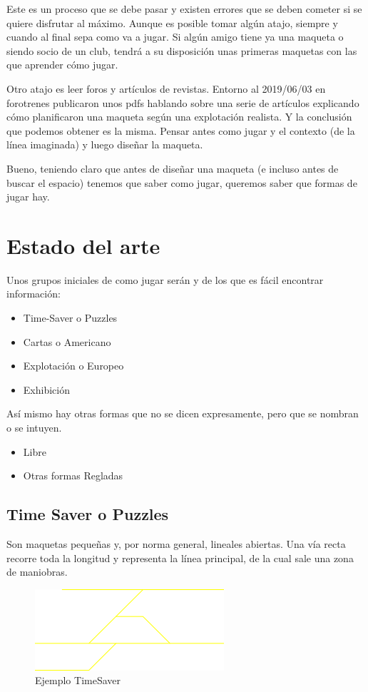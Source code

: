 Este es un proceso que se debe pasar y existen errores que se deben cometer si se quiere disfrutar al máximo. Aunque es posible tomar algún atajo, siempre y cuando al final sepa como va a jugar. Si algún amigo tiene ya una maqueta o siendo socio de un club, tendrá a su disposición unas primeras maquetas con las que aprender cómo jugar.

Otro atajo es leer foros y artículos de revistas. Entorno al 2019/06/03 en forotrenes publicaron unos pdfs hablando sobre una serie de artículos explicando cómo planificaron una maqueta según una explotación realista. Y la conclusión que podemos obtener es la misma. Pensar antes como jugar y el contexto (de la línea imaginada) y luego diseñar la maqueta.

Bueno, teniendo claro que antes de diseñar una maqueta (e incluso antes de buscar el espacio) tenemos que saber como jugar, queremos saber que formas de jugar hay.

\section{Estado del arte}
Unos grupos iniciales de como jugar serán y de los que es fácil encontrar información:

\begin{itemize}
	\item Time-Saver o Puzzles
	\item Cartas o Americano
	\item Explotación o Europeo
	\item Exhibición
\end{itemize}
Así mismo hay otras formas que no se dicen expresamente, pero que se nombran o se intuyen.
\begin{itemize}
	\item Libre
	\item Otras formas Regladas
\end{itemize}
\subsection{Time Saver o Puzzles}
Son maquetas pequeñas y, por norma general, lineales abiertas. Una vía recta recorre toda la longitud y representa la línea principal, de la cual sale una zona de maniobras.
\begin{figure}[h]
	\centering\includegraphics[]{chapters/01_jugar/path4865.png}
	\caption{Ejemplo TimeSaver}
	\label{fig:timesaver} %
\end{figure}

